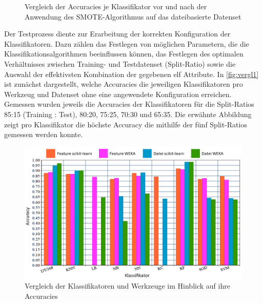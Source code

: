 \begin{figure}
  \centering
  \caption{Vergleich der Accuracies je Klassifikator vor und nach der Anwendung des SMOTE-Algorithmus auf das dateibasierte Datenset\label{fig:smoted}}
\end{figure}

Der Testprozess diente zur Erarbeitung der korrekten Konfiguration der Klassifikatoren. Dazu zählen das Festlegen von möglichen Parametern, die die Klassifikationsalgorithmen beeinflussen können, das Festlegen des optimalen Verhältnisses zwischen Training- und Testdatenset (Split-Ratio) sowie die Auswahl der effektivsten Kombination der gegebenen elf Attribute. In \autoref{fig:vergl1} ist zunächst dargestellt, welche Accuracies die jeweiligen Klassifikatoren pro Werkzeug und Datenset ohne eine angewendete Konfiguration erreichen. Gemessen wurden jeweils die Accuracies der Klassifikatoren für die Split-Ratios 85:15 (Training : Test), 80:20, 75:25, 70:30 und 65:35. Die erwähnte Abbildung zeigt pro Klassifikator die höchste Accuracy die mithilfe der fünf Split-Ratios gemessen werden konnte. 

\begin{figure}[]
    \centering
    \includegraphics[width=\textwidth]{images/Vergleich1}
    \caption{Vergleich der Klassifikatoren und Werkzeuge im Hinblick auf ihre Accuracies\label{fig:vergl1}}
\end{figure}


